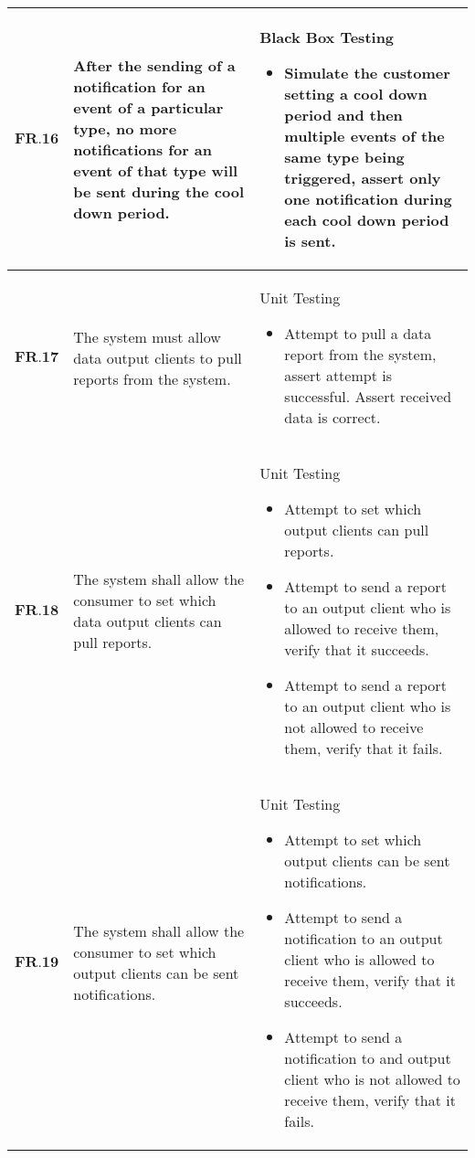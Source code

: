 \begin{longtable}[H]{| p{1.5cm}| p{4.5cm}| p{10.5cm}|}
        $\textbf{FR.16}$ & After the sending of a notification for an event of a particular type, no more notifications for an event of that type will be sent during the cool down period. & Black Box Testing\begin{itemize}\item Simulate the customer setting a cool down period and then multiple events of the same type being triggered, assert only one notification during each cool down period is sent.\end{itemize}                                                                                                                    \\ \hline
        $\textbf{FR.17}$ & The system must allow data output clients to pull reports from the system.                                                                                       & Unit Testing\begin{itemize}\item Attempt to pull a data report from the system, assert attempt is successful. Assert received data is correct.\end{itemize}                                                                                                                                                                                          \\ \hline
       $ \textbf{FR.18}$ & The system shall allow the consumer to set which data output clients can pull reports.                                                                           & Unit Testing\begin{itemize}\item Attempt to set which output clients can pull reports.\item Attempt to send a report to an output client who is allowed to receive them, verify that it succeeds.\item Attempt to send a report to an output client who is not allowed to receive them, verify that it fails.\end{itemize}                 \\ \hline
    	$\textbf{FR.19}$ & The system shall allow the consumer to set which output clients can be sent notifications.                                                                       & Unit Testing\begin{itemize}\item Attempt to set which output clients can be sent notifications.\item Attempt to send a notification to an output client who is allowed to receive them, verify that it succeeds.\item Attempt to send a notification to and output client who is not allowed to receive them, verify that it fails.\end{itemize} \\ \hline
\end{longtable}
